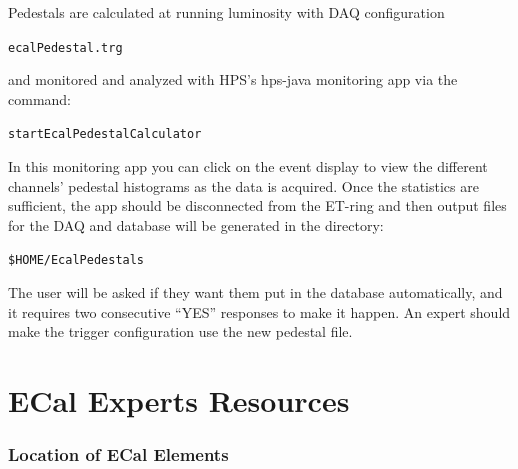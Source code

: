 \documentclass[12pt]{article}
\begin{document}
   Pedestals are calculated at running luminosity with DAQ configuration \begin{center}\texttt{ecalPedestal.trg}\end{center} and monitored and analyzed with HPS's hps-java monitoring app via the command:
       \begin{center}\texttt{startEcalPedestalCalculator}\end{center}
       In this monitoring app you can click on the event display to view the different channels' pedestal histograms as the data is acquired.  Once the statistics are sufficient, the app should be disconnected from the ET-ring and then output files for the DAQ and database will be generated in the directory:\begin{center}\texttt{\$HOME/EcalPedestals}\end{center}  The user will be asked if they want them put in the database automatically, and it requires two consecutive ``YES'' responses to make it happen.  An expert should make the trigger configuration use the new pedestal file.


\newpage

\part{ECal Experts Resources}

   \section{Location of ECal Elements}
\end{document}
